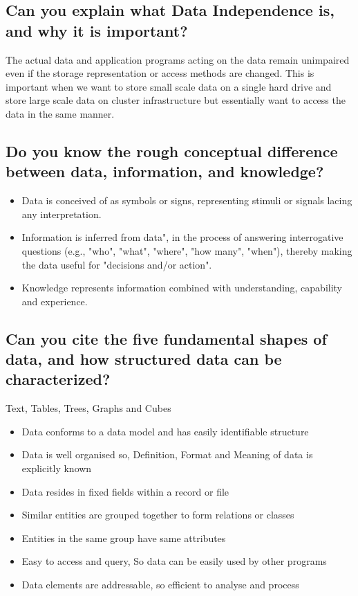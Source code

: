 \documentclass{article}
\begin{document}
\subsection{Can you explain what Data Independence is, and why it is important?}

The actual data and application programs acting on the data remain unimpaired even if the storage representation or access methods are changed. This is important when we want to store small scale data on a single hard drive and store large scale data on cluster infrastructure but essentially want to access the data in the same manner.

\subsection{Do you know the rough conceptual difference between data, information, and knowledge?}

\begin{itemize}
    \item Data is conceived of as symbols or signs, representing stimuli or signals lacing any interpretation.
    \item Information is inferred from data", in the process of answering interrogative questions (e.g., "who", "what", "where", "how many", "when"), thereby making the data useful for "decisions and/or action".
    \item Knowledge represents information combined with understanding, capability and experience.
\end{itemize}


\subsection{Can you cite the five fundamental shapes of data, and how structured data can be characterized?}

Text, Tables, Trees, Graphs and Cubes

\begin{itemize}
    \item Data conforms to a data model and has easily identifiable structure
    \item Data is well organised so, Definition, Format and Meaning of data is explicitly known
    \item Data resides in fixed fields within a record or file
    \item Similar entities are grouped together to form relations or classes
    \item Entities in the same group have same attributes
    \item Easy to access and query, So data can be easily used by other programs
    \item Data elements are addressable, so efficient to analyse and process
\end{itemize}
\end{document}
